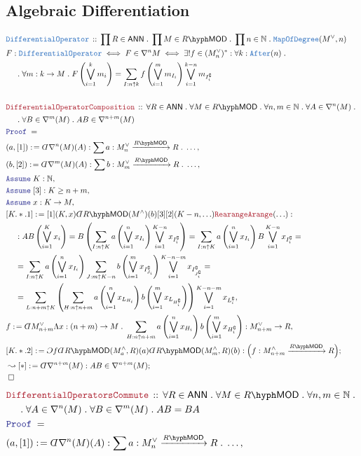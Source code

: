 \documentclass[12pt]{scrartcl}%
\newcommand{\TYPE}[1]{\textcolor{NavyBlue}{\mathtt{#1}}}%
\newcommand{\LOGIC}[1]{\textcolor{Blue}{\mathtt{#1}}}%
\newcommand{\THM}[1]{\textcolor{Maroon}{\mathtt{#1}}}%
\renewcommand{\.}{\; . \;} %
\newcommand{\de}{: \kern 0.1pc =} %
\newcommand{\Theorem}[2]{& \THM{#1} \, :: \, #2 \\ & \Proof = \\ } %
\newcommand{\DeclareType}[2]{& \TYPE{#1} \, :: \, #2 \\}%
\newcommand{\DefineNamedType}[4]{& #1 : \TYPE{#2} \iff #3 \iff #4 \\}%
\newcommand{\NewLine}{\\ & \kern 1pc}%
\newcommand{\Page}[1]{ \begin{align*} #1 \end{align*}  }%
\newcommand{ \bd }{ \ByDef }%
\newcommand{\Nat}{\mathbb{N}}%
\renewcommand{\c}{\complement}%
\newcommand{\Say}[3]{& #1 \de #2 : #3, \\} %
\newcommand{\Conclude}[3]{& #1 \de #2 : #3; \\}%
\newcommand{\DeriveConclude}[3]{& \leadsto #1 \de #2 : #3 ; \\} %
\newcommand{\Assume}[2]{& \LOGIC{Assume} \; #1 : #2, \\} %
\newcommand{\QED}{\; \square} %
\newcommand{\EndProof}{& \QED \\} %
\newcommand{\ByDef}{\rotatebox[origin=c]{-180}{$D$}}%
\newcommand{\ByConstr}{\rotatebox[origin=c]{-180}{$C$}}%
\newcommand{\Proof}{\LOGIC{Proof} \; } %
\newcommand{\Arrow}[1]{\xrightarrow{#1}}%
\newcommand{\LMOD}[1]{#1\hyph\mathsf{MOD}} %
\newcommand{\ANN}{\mathsf{ANN}} %
\begin{document}
\subsection{Algebraic Differentiation}
\Page{
	\DeclareType{DifferentialOperator}{ \prod R \in \ANN \. \prod M \in \LMOD{R} \. \prod n \in \Nat \.  \TYPE{MapOfDegree}(M^\vee,n) }
	\DefineNamedType{F}{DifferentialOperator}{F \in \nabla^n M}{
		\exists! f \in (M^\vee_n)^* : \forall k : \TYPE{After}(n) \. \NewLine \.  
		\forall m : k \to M \. F\left( \bigvee^k_{i=1} m_i \right) = \sum_{I : n \uparrow k} f\left( \bigvee^{m}_{i=1} m_{I_i} \right) \bigvee^{k - n}_{i=1} m_{I^\c_i}   
	}
	\\
	\Theorem{DifferentialOperatorComposition}{\forall R \in \ANN \. \forall M \in \LMOD{R} \. \forall n,m \in \Nat \. \forall A \in \nabla^n(M) \. 
		\NewLine \. \forall B \in \nabla^m(M) \. AB \in \nabla^{n + m}(M)}
	\Say{(a,[1])}{\bd \nabla^n(M)(A) }{\sum a : M^\vee_n \Arrow{\LMOD{R}} R \. \ldots}
	\Say{(b,[2])}{\bd \nabla^m(M)(A)}{ \sum b : M^\vee_m \Arrow{\LMOD{R}} R \. \ldots}
	\Assume{K}{\Nat}
	\Assume{[3]}{K \ge n + m}
	\Assume{x}{K \to M}
	\Say{[K.*.1]}
	{ [1](K,x)\bd\LMOD{R}(M^\wedge)(b)[3][2](K-n,\ldots) \THM{RearangeArange}(\ldots) }
	{
		\NewLine :
		AB\left( \bigvee^K_{i=1} x_i\right) =
		B\left(  \sum_{I : n \uparrow K} a\left( \bigvee^n_{i=1} x_{I_i} \right) \bigvee^{K-n}_{i=1} x_{I^\c_i}   \right) = 
	        \sum_{I : n \uparrow K} a\left( \bigvee^n_{i=1} x_{I_i} \right) B \bigvee^{K-n}_{i=1} x_{I^\c_i} = \NewLine =   
		\sum_{I : n \uparrow K} a\left( \bigvee^n_{i=1} x_{I_i} \right) \sum_{J : m \uparrow K - n} b\left( \bigvee^m_{i=1} x_{I_{J_i}^\c} \right) \bigvee^{K-n-m}_{i=1} x_{I_{J_i^\c}^\c} = \NewLine = 
		\sum_{L : n + m \uparrow K} \left( \sum_{H : n \uparrow n + m} a\left( \bigvee^n_{i=1 }x_{L_{H_i}} \right) b\left( \bigvee^m_{i=1} x_{L_{H_i^\c}} \right) \right) \bigvee^{K-n-m}_{i=1} x_{L^\c_i}
	}
	\Say{f}{ \bd M^\vee_{n+m} \Lambda x : (n +m) \to M \. \sum_{H : n \uparrow n + m} a\left( \bigvee^n_{i=1 }x_{H_i} \right) b\left( \bigvee^m_{i=1} x_{H_i^\c} \right) }{ M^\vee_{n+m} \to R }
	\Conclude{[K.*.2]}{\ByConstr f\bd \LMOD{R}(M^\wedge_a,R)(a) \bd \LMOD{R}(M^\wedge_m,R)(b)}{\Big( f : M^\wedge_{n+m} \Arrow{\LMOD{R}} R \Big)}
	\DeriveConclude{[*]}{\bd \nabla^{n+m}(M)}{AB \in \nabla^{n+m}(M)}
	\EndProof
}\Page{
	\Theorem{DifferentialOperatorsCommute}{
		\forall R \in \ANN \. 
		\forall M \in \LMOD{R} \. 
		\forall n,m \in \Nat \. \NewLine \.  
		\forall A \in \nabla^n(M) \. 
		\forall B \in \nabla^m(M) \.
		AB = BA
	}
	\Say{(a,[1])}{\bd \nabla^n(M)(A) }{\sum a : M^\vee_n \Arrow{\LMOD{R}} R \. \ldots}
}
\end{document}
